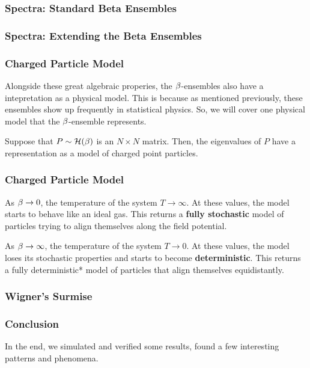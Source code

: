 \begin{frame} \frametitle{Spectra: Standard Beta Ensembles}
\end{frame}
\begin{frame} \frametitle{Spectra: Extending the Beta Ensembles}
\end{frame}
\begin{frame} \frametitle{Charged Particle Model}

  Alongside these great algebraic properies, the $\beta$-ensembles also have a intepretation as a physical model.
  This is because as mentioned previously, these ensembles show up frequently in statistical physics.
  So, we will cover one physical model that the $\beta$-ensemble represents.

  Suppose that $P \sim \mathcal{H}(\beta)$ is an $N \times N$ matrix. Then, the eigenvalues of $P$ have a representation as a model of charged point particles.

\end{frame}
\begin{frame} \frametitle{Charged Particle Model}
   As $\beta \to 0$, the temperature of the system $T \to \infty$.
  At these values, the model starts to behave like an ideal gas.
   This returns a \textbf{fully stochastic} model of particles trying to align themselves along the field potential.

   As $\beta \to \infty$, the temperature of the system $T \to 0$.
  At these values, the model loses its stochastic properties and starts to become \textbf{deterministic}. This returns a fully deterministic*
  model of particles that align themselves equidistantly.

\end{frame}
\begin{frame} \frametitle{Wigner's Surmise}
\end{frame}
\begin{frame} \frametitle{Conclusion}
  In the end, we simulated and verified some results, found a few interesting patterns and phenomena.
\end{frame}


